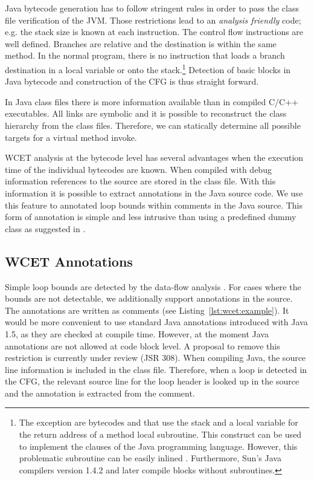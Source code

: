 Java bytecode generation has to follow stringent rules \cite{jvm} in
order to pass the class file verification of the JVM. Those
restrictions lead to an \emph{analysis friendly} code; e.g. the stack
size is known at each instruction. The control flow instructions are
well defined. Branches are relative and the destination is within the
same method. In the normal program, there is no instruction that
loads a branch destination in a local variable or onto the
stack.\footnote{The exception are bytecodes  and
 that use the stack and a local variable for the return
address of a method local subroutine. This construct can be used to
implement the  clauses of the Java programming
language. However, this problematic subroutine can be easily inlined
\cite{gc:subroutine:inlining}. Furthermore, Sun's Java compilers
version 1.4.2 and later compile  blocks without
subroutines.} Detection of basic blocks in Java bytecode and
construction of the CFG is thus straight forward.

In Java class files there is more information available than in
compiled C/C++ executables. All links are symbolic and it is possible
to reconstruct the class hierarchy from the class files. Therefore,
we can statically determine all possible targets for a virtual method
invoke.

WCET analysis at the bytecode level has several advantages when the
execution time of the individual bytecodes are known. When compiled
with debug information references to the source are stored in the
class file. With this information it is possible to extract
annotations in the Java source code. We use this feature to annotated
loop bounds within comments in the Java source. This form of
annotation is simple and less intrusive than using a predefined dummy
class as suggested in \cite{R:Bernat:2000a}.

\subsection{WCET Annotations} \label{sec:annot}

Simple loop bounds are detected by the data-flow analysis
\cite{dfa:puffitsch:2009}. For cases where the bounds are not
detectable, we additionally support annotations in the source. The
annotations are written as comments (see
Listing~\ref{lst:wcet:example}). It would be more convenient to use
standard Java annotations introduced with Java 1.5, as they are
checked at compile time. However, at the moment Java annotations are
not allowed at code block level. A proposal to remove this
restriction is currently under review (JSR 308). When compiling Java,
the source line information is included in the class file. Therefore,
when a loop is detected in the CFG, the relevant source line for the
loop header is looked up in the source and the annotation is
extracted from the comment.

